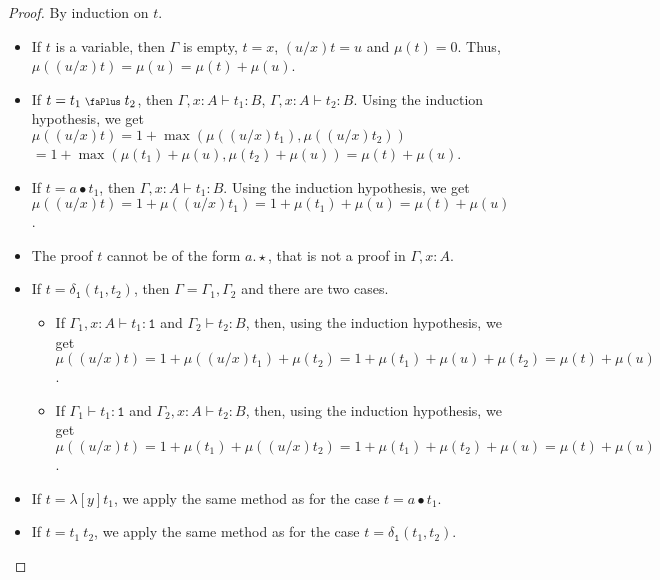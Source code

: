 \documentclass[screen, sigconf,authorversion,nonacm]{acmart}
\theoremstyle{acmdefinition}
\numberwithin{equation}{section}
\newcommand\abstr[1]{[#1]}
\newcommand\plus{\mathrel{\text{\normalfont\scalebox{0.7}{\faPlus}}}}
\newcommand\one{\ensuremath{\mathtt 1}}
\newcommand\elimone{\delta_{\one}}
\begin{document}
\begin{proof}
  By induction on $t$.
  \begin{itemize}
    \item If $t$ is a variable, then $\Gamma$ is empty, $t = x$, 
      $(u/x)t = u$ and $\mu(t) = 0$.
      Thus, $\mu((u/x)t) = \mu(u) = \mu(t)+\mu(u)$.

    \item If $t = t_1 \plus t_2$, then $\Gamma, x:A \vdash t_1:B$,
      $\Gamma, x:A \vdash t_2:B$.  Using the induction hypothesis, we get 
      $\mu((u/x)t)
      = 1 + 
      \max(\mu((u/x)t_1),\mu((u/x)t_2))$ $= 1 + \max(\mu(t_1) + \mu(u),
      \mu(t_2) + \mu(u))
      = \mu(t) + \mu(u)$.

    \item If $t = a \bullet t_1$, then $\Gamma, x:A \vdash t_1:B$.
      Using the induction hypothesis, we get 
      $\mu((u/x)t)
      = 1 + \mu((u/x)t_1)
      = 1 + \mu(t_1) + \mu(u) = \mu(t) + \mu(u)$.

    \item The proof $t$ cannot be of the form
      $a.\star$, that is not a proof in $\Gamma, x:A$.

      \item If $t = \elimone(t_1,t_2)$, then
      $\Gamma = \Gamma_1, \Gamma_2$ and there are two cases.
      \begin{itemize}
	\item 
	  If $\Gamma_1, x:A \vdash t_1:\one$ and $\Gamma_2 \vdash t_2:B$,
	  then, using the induction hypothesis, we get
	  $\mu((u/x)t)
	  = 1 + \mu((u/x)t_1) + \mu(t_2)
	  = 1 + \mu(t_1) + \mu(u) + \mu(t_2)
	  = \mu(t) + \mu(u)$.

	\item 
	  If $\Gamma_1 \vdash t_1:\one$ and $\Gamma_2, x:A \vdash t_2:B$,
	  then, using the induction hypothesis, we get
	  $\mu((u/x)t)
	  = 1 + \mu(t_1) + \mu((u/x)t_2)
	  = 1 + \mu(t_1) + \mu(t_2) + \mu(u)
	  = \mu(t) + \mu(u)$.
      \end{itemize}


    \item If $t = \lambda \abstr{y} t_1$,
we apply the same method as for the case $t = a \bullet t_1$.
      

    \item If $t = t_1~t_2$, we apply the same method as for the
      case $t = \elimone(t_1,t_2)$.


\end{itemize}
\end{proof}
\end{document}
